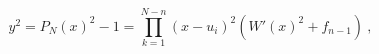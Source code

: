\begin{equation}
y^2=P_N(x)^2-1=\prod_{k=1}^{N-n}(x-u_i)^2 (W'(x)^2+f_{n-1}) \ , 
\label{curvepure}
\end{equation}


